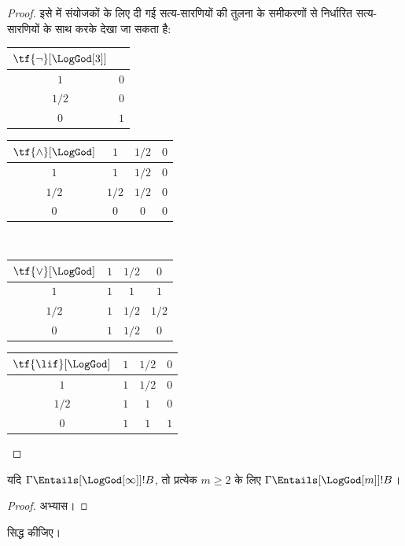 \documentclass[../../../include/open-logic-section]{subfiles}
\begin{document}
\begin{proof}
  इसे  में संयोजकों के लिए दी गई सत्य-सारणियों
  की तुलना  के समीकरणों से निर्धारित सत्य-सारणियों के साथ
  करके देखा जा सकता है:
  \begin{center}
    \begin{tabular}{c|c} 
      $\tf{\lnot}[\LogGod[3]]$ & \\ 
      \hline  
      $1$ & $0$ \\ 
      $1/2$ & $0$ \\
      $0$ & $1$ 
    \end{tabular}
    \quad
    \begin{tabular}{c|ccc} 
      $\tf{\land}[\LogGod]$ & $1$ & $1/2$ & $0$ \\ 
      \hline 
      $1$ & $1$ & $1/2$ & $0$ \\ 
      $1/2$ & $1/2$ & $1/2$ & $0$\\ 
      $0$ & $0$ & $0$ & $0$ 
    \end{tabular}
    \\[2ex]
    \begin{tabular}{c|ccc} 
      $\tf{\lor}[\LogGod]$ & $1$ & $1/2$ & $0$ \\ 
      \hline 
      $1$ & $1$ & $1$ & $1$ \\ 
      $1/2$ & $1$ & $1/2$ & $1/2$ \\
      $0$ & $1$ & $1/2$ & $0$ 
    \end{tabular}
    \quad
    \begin{tabular}{c|ccc} 
      $\tf{\lif}[\LogGod]$ & $1$ & $1/2$ & $0$ \\ 
      \hline 
      $1$ & $1$ & $1/2$ & $0$ \\ 
      $1/2$ & $1$ & $1$ & $0$  \\ 
      $0$ & $1$ & $1$ & $1$ 
    \end{tabular}
  \end{center} 
\end{proof}

\begin{prop}
  यदि $\Gamma \Entails[\LogGod[\infty]] !B$, तो प्रत्येक $m \ge 2$ के लिए
  $\Gamma \Entails[\LogGod[m]] !B$।
\end{prop}

\begin{proof}
  अभ्यास।
\end{proof}

\begin{prob}
   सिद्ध कीजिए।
\end{prob}
\end{document}
